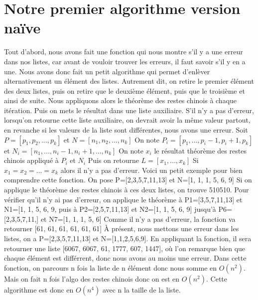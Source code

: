 \documentclass[a4paper, 11pt]{report}
\begin{document}
\section{Notre premier algorithme version naïve }
Tout d'abord, nous avons fait une fonction qui nous montre s'il y a une erreur dans nos listes, car avant de vouloir trouver les erreurs, il faut savoir s'il y en a une.
Nous avons donc fait un petit algorithme qui permet d'enlèver alternativement un élément des listes. Autrement dit, on retire le premier élément des deux listes, puis on retire que le deuxième élément, puis que le troisième et ainsi de suite. Nous appliquons alors le théorème des restes chinois à chaque itération. Puis on mets le résultat dans une liste auxiliaire. S'il n'y a pas d'erreur,
lorsqu'on retourne cette liste auxiliaire, on devrait avoir la même valeur partout, en revanche si les valeurs de la liste sont différentes, nous avons une erreur. \newline
\newline
Soit $P=[p_1 , p_2, ... , p_k]$ et $N=[n_1, n_2, ..., n_k]$ \newline
On note $P_i = [p_1,..., p_i-1, p_i+1, p_k]$ et $N_i=[n_1,..., n_i-1, n_i+1, ... , n_k]$ \newline
On note $x_i$ le résultat théorème des restes chinois appliqué à $P_i$ et $N_i$ \newline
Puis on retourne 
$L=[x_1, ..., x_k]$ \newline
Si 
$x_1=x_2=...=x_k$ 
alors il n'y a pas d'erreur. \newline
\newline
Voici un petit exemple pour bien comprendre cette fonction.\newline
On pose P=[2,3,5,7,11,13] et N=[1, 1, 1, 5, 6, 9] \newline
Si on applique le théorème des restes chinois à ces deux listes, on trouve 510510. Pour vérifier qu'il n'y ai pas d'erreur, on applique le théorème à
P1=[3,5,7,11,13] et N1=[1, 1, 5, 6, 9, puis à P2=[2,5,7,11,13] et N2=[1, 1, 5, 6, 9] jusqu'à P6=[2,3,5,7,11,] et N7=[1, 1, 1, 5, 6]\newline
Comme il n'y a pas d'erreur, la fonction va retourner [61, 61, 61, 61, 61, 61] \newline
À présent, nous mettons une erreur dans les listes, on a P=[2,3,5,7,11,13] et N=[1,1,2,5,6,9]. En appliquant la fonction, il sera retourner une liste [6067, 6067, 61, 1777, 607, 1447], où l'on remarque bien que chaque élément est différrent, donc nous avons au moins une erreur.
Dans cette fonction, on parcours n fois la liste de n élément donc nous somme en $O(n^2)$. Mais on fait n fois l'algo des restes chinois donc on est en $O(n^2)$. Cette algorithme est donc en $O(n^4)$ avec n la taille de la liste. 
\end{document}
